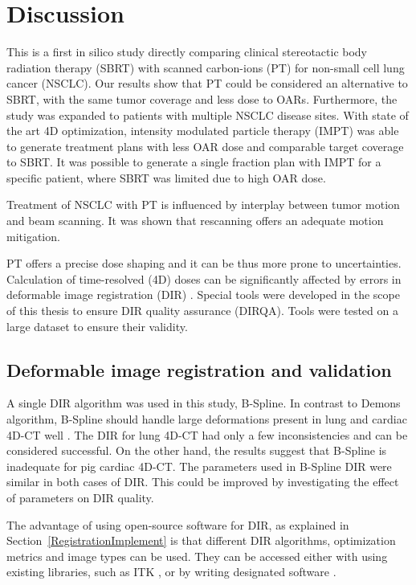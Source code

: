 \documentclass[type=dr, dr=rernat, accentcolor=tud7b,colorbacktitle, bigchapter, openright, twoside, 12pt ]{tudthesis}
\begin{document}
\chapter{Discussion}

This is a first in silico study directly comparing clinical stereotactic body radiation therapy (SBRT) with scanned carbon-ions (PT) for non-small cell lung cancer (NSCLC). 
Our results show that PT could be considered an alternative to SBRT, with the same tumor coverage and less dose to OARs. Furthermore, the study was expanded to patients with multiple
NSCLC disease sites. With state of the art 4D optimization, intensity modulated particle therapy (IMPT) was able to generate treatment plans with less OAR dose and comparable target coverage
to SBRT. It was possible to generate a single fraction plan with IMPT for a specific patient, where SBRT was limited due to high OAR dose.

Treatment of NSCLC with PT is influenced by interplay between tumor motion and beam scanning. It was shown that rescanning offers an
adequate motion mitigation. 

PT offers a precise dose shaping and it can be thus more prone to uncertainties. Calculation of time-resolved (4D) doses can be significantly
affected by errors in deformable image registration (DIR) \cite{Heath2006}. Special tools were developed in the scope of this thesis to ensure DIR quality assurance (DIRQA).
Tools were tested on a large dataset to ensure their validity.


\section{Deformable image registration and validation}

A single DIR algorithm was used in this study, B-Spline. In contrast to Demons algorithm, B-Spline should handle large deformations present in lung and cardiac 4D-CT well \cite{Tang2013}.
The DIR for lung 4D-CT had only a few inconsistencies and can be considered successful. On the other hand, the results suggest that B-Spline is inadequate for pig cardiac 4D-CT. The parameters used
in B-Spline DIR were similar in both cases of DIR. This could be improved by investigating the effect of parameters on DIR quality. 

The advantage of using open-source software for DIR, as explained in Section~\ref{RegistrationImplement} is that different DIR algorithms, 
optimization metrics and image types can be used. They can be accessed either with using
existing libraries, such as ITK \cite{Yoo2002}, or by writing designated software \cite{Fedorov2015}. 
\end{document}
